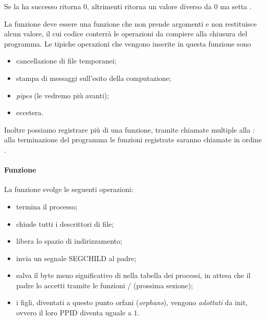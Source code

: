 Se la  ha successo ritorna $0$, altrimenti ritorna un valore diverso da $0$ ma  setta .

La funzione  deve essere una funzione che non prende argomenti e non restituisce alcun valore, il cui codice conterrà le operazioni da compiere alla chiusura del programma. Le tipiche operazioni che vengono inserite in questa funzione sono \begin{itemize}
    \item cancellazione di file temporanei;
    \item stampa di messaggi sull'esito della computazione;
    \item \emph{pipes} (le vedremo più avanti);
    \item eccetera.
\end{itemize}

Inoltre possiamo registrare più di una funzione, tramite chiamate multiple alla : alla terminazione del programma le funzioni registrate saranno chiamate in ordine .

\paragraph{Funzione } 
La funzione  svolge le seguenti operazioni: \begin{itemize}
    \item termina il processo;
    \item chiude tutti i descrittori di file;
    \item libera lo spazio di indirizzamento;
    \item invia un segnale \textsf{SEGCHILD} al padre;
    \item salva il byte meno significativo di  nella tabella dei processi, in attesa che il padre lo accetti tramite le funzioni / (prossima sezione);
    \item i figli, diventati a questo punto orfani (\emph{orphans}), vengono \emph{adottati} da \textsf{init}, ovvero il loro \textsf{PPID} diventa uguale a $1$. 
\end{itemize}